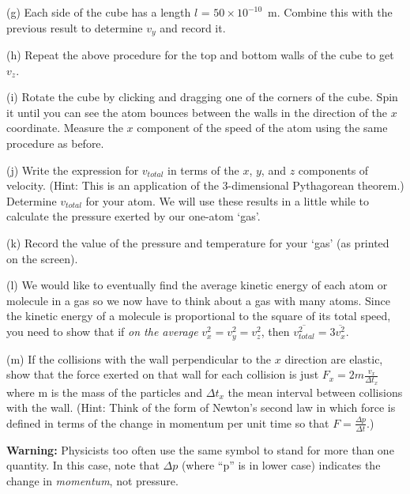 (g) Each side of the cube has a length $l$ = $50 \times 10^{-10}$~m.
Combine this with the previous result to determine $v_y$ and record it.
\vspace{20mm}

(h) Repeat the above procedure for the top and bottom walls of the cube to get $v_z$.
\vspace{20mm}

(i) Rotate the cube by clicking and dragging one of the corners of the cube.
Spin it until you can see the atom bounces between the walls in the direction of
the $x$ coordinate.
Measure the $x$ component of the speed of the atom using the same procedure as before.
\vspace{20mm}

(j) Write the
expression for \( v_{total} \) in terms of the $x$, $y$, and $z$ components
of velocity. (Hint: This is an application of the 3-dimensional Pythagorean
theorem.) Determine $v_{total}$ for your atom.
We will use these results in a little while to calculate the pressure exerted by
our one-atom `gas'.
\vspace{20mm}

(k) Record the value of the pressure and temperature for your `gas' (as printed on the screen).
\vspace{20mm}

(l) We would like to eventually find the average kinetic energy of each atom or molecule
in a gas so we now have to think about a gas with many atoms.
Since the kinetic energy of a molecule is proportional to the square
of its total speed, you need to show that if \emph{on the average}
\( v_{x}^{2}=v_{y}^{2}=v_{z}^{2} \), then \( \overline{v_{total}^{2}}=3\overline{v_{x}^{2}} \).
\vspace{20mm}

\newpage

(m) If the collisions with the wall perpendicular to the $x$ direction
are elastic, show that the force exerted on that wall for each collision
is just \( F_{x}=2m\frac{v_{x}}{\Delta t_{x}} \)where m is the mass
of the particles and \( \Delta t_{x} \) the mean interval between
collisions with the wall. (Hint: Think of the form of Newton's second
law in which force is defined in terms of the change in momentum per
unit time so that \( F=\frac{\Delta p}{\Delta t} \).)

\textbf{Warning:} Physicists too often use the same symbol to stand
for more than one quantity. In this case, note that \( \Delta p \)
(where {}``p'' is in lower case) indicates the change in \emph{momentum},
not pressure.
\vspace{20mm}

